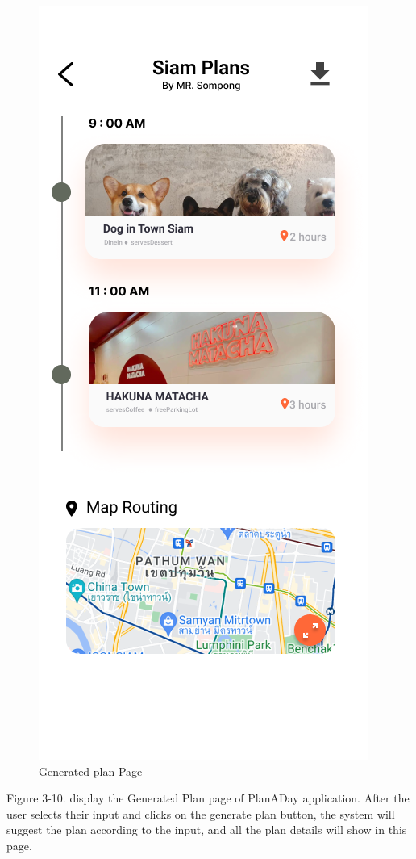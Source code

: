 \newpage
\begin{figure}[!h]
    \centering
    \includegraphics[width=0.5\linewidth]{chapter3/UI_Other_plan.png}
    \caption{Generated plan Page}
    \label{fig:Generated plan Page}
\end{figure}
\noindent
Figure 3-10. display the Generated Plan page of PlanADay application. After the
user selects their input and clicks on the generate plan button, the system will
suggest the plan according to the input, and all the plan details will show in this
page.

